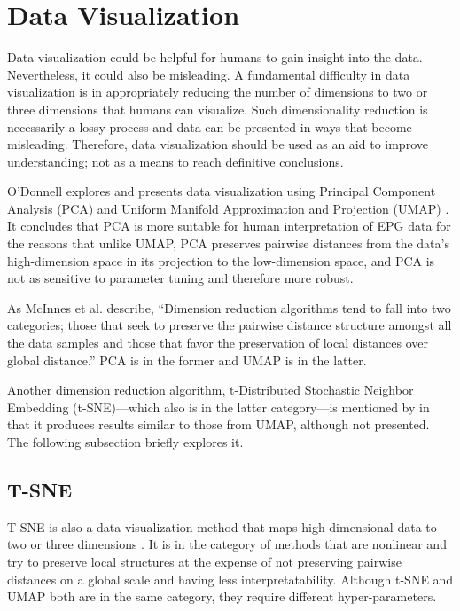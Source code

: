 \section{Data Visualization}

Data visualization could be helpful for humans to gain insight into the data. Nevertheless, it could also be misleading. A fundamental difficulty in data visualization is in appropriately reducing the number of dimensions to two or three dimensions that humans can visualize. Such dimensionality reduction is necessarily a lossy process and data can be presented in ways that become misleading. Therefore, data visualization should be used as an aid to improve understanding; not as a means to reach definitive conclusions.

O'Donnell \cite{odonnell_clustering_2021} explores and presents data visualization using Principal Component Analysis (PCA) \cite{abdi_principal_2010} and Uniform Manifold Approximation and Projection (UMAP) \cite{mcinnes_umap_2018}. It concludes that PCA is more suitable for human interpretation of EPG data for the reasons that unlike UMAP, PCA preserves pairwise distances from the data's high-dimension space in its projection to the low-dimension space, and PCA is not as sensitive to parameter tuning and therefore more robust.

As McInnes et al. \cite{mcinnes_umap_2018} describe, ``Dimension reduction algorithms tend to fall into two categories; those that seek to preserve the pairwise distance structure amongst all the data samples and those that favor the preservation of local distances over global distance.'' PCA is in the former and UMAP is in the latter.

Another dimension reduction algorithm, t-Distributed Stochastic Neighbor Embedding (t-SNE)---which also is in the latter category---is mentioned by \cite{odonnell_clustering_2021} in that it produces results similar to those from UMAP, although not presented. The following subsection briefly explores it.

\subsection{T-SNE}

T-SNE is also a data visualization method that maps high-dimensional data to two or three dimensions \cite{maaten_visualizing_2008}\cite{wattenberg_how_2016}. It is in the category of methods that are nonlinear and try to preserve local structures at the expense of not preserving pairwise distances on a global scale and having less interpretatability. Although t-SNE and UMAP both are in the same category, they require different hyper-parameters.

